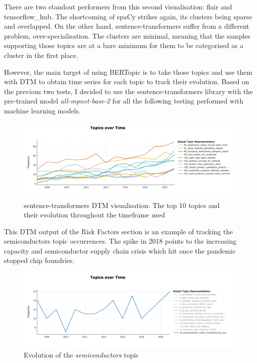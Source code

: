 \documentclass[12pt,MSc,a4paper,oneside]{muthesis}
\begin{document}
    There are two standout performers from this second visualisation: flair and tensorflow\_hub. The shortcoming of spaCy strikes again, its clusters being sparse and overlapped. On the other hand, sentence-transformers suffer from a different problem, over-specialisation. The clusters are minimal, meaning that the samples supporting those topics are at a bare minimum for them to be categorised as a cluster in the first place.

    However, the main target of using BERTopic is to take those topics and use them with DTM to obtain time series for each topic to track their evolution. Based on the previous two tests, I decided to use the sentence-transformers library with the pre-trained model \textit{all-mpnet-base-2} for all the following testing performed with machine learning models.

    \begin{figure}[h]
      \centering
      \includegraphics[scale=0.4]{results/tot_longesst_sentence.png}
      \caption{sentence-transformers DTM visualisation: The top 10 topics and their evolution throughout the timeframe used}
    \end{figure}

    This DTM output of the Risk Factors section is an example of tracking the semiconductors topic occurrences. The spike in 2018 points to the increasing capacity and semiconductor supply chain crisis which hit once the pandemic stopped chip foundries.

    \begin{figure}[h]
      \centering
      \includegraphics[scale=0.3]{results/topic_evolution_example.png}
      \caption{Evolution of the \textit{semiconductors} topic}
    \end{figure}
\end{document}
